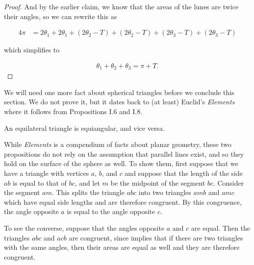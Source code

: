 \begin{proof}
And by the earlier claim, we know that the areas of the lunes are twice their angles, so we can rewrite this as


	\begin{align*}
4\pi &= 2\theta_1 + 2\theta_1 
+  (2\theta_2 - T) + (2\theta_2-T) 
+ (2\theta_3 - T)	 + (2\theta_3 - T)
\end{align*}

which simplifies to 

	\begin{align*}
\theta_1+\theta_2+\theta_3 = \pi + T.
\end{align*}

\end{proof}

We will need one more fact about spherical triangles before we conclude this section.  We do not prove it, but it dates back to (at least) Euclid's \textit{Elements} \cite{elements} where it follows from Propositions I.6 and I.8.  

\begin{fact}
	An equilateral triangle is equiangular, and vice versa.
\end{fact}

While \textit{Elements} is a compendium of facts about planar geometry, these two propositions do not rely on the assumption that parallel lines exist, and so they hold on the surface of the sphere as well.  To show them, first suppose that we have a triangle with vertices $a$, $b$, and $c$ and suppose that the length of the side $ab$ is equal to that of $bc$, and let $m$ be the midpoint of the segment $bc$.  Consider the segment $am$. This splits the triangle $abc$ into two triangles $amb$ and $amc$ which have equal side lengths and are therefore congruent.  By this congruence, the angle opposite $a$ is equal to the angle opposite $c$.

To see the converse, suppose that the angles opposite $a$ and $c$ are equal.  Then the triangles $abc$ and $acb$ are congruent, since  implies that if there are two triangles with the same angles, then their areas are equal as well and they are therefore congruent.


